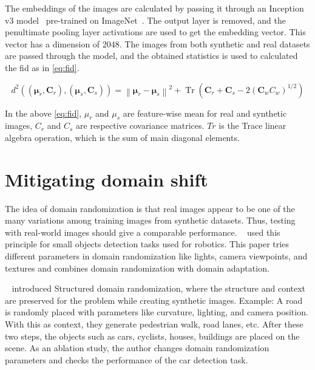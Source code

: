 The embeddings of the images are calculated by passing it through an Inception v3 model~\cite{Szegedy2016RethinkingTI} pre-trained on ImageNet~\cite{Deng2009ImageNetAL}.
The output layer is removed, and the penultimate pooling layer activations are used to get the embedding vector.
This vector has a dimension of 2048.
The images from both synthetic and real datasets are passed through the model, and the obtained statistics is used to calculated the \gls{fid} as in \autoref{eq:fid}.

\begin{equation}
    d^{2}\left((\boldsymbol{\mu}_{r}, \boldsymbol{C}_{r}),\left(\boldsymbol{\mu}_{s}, \boldsymbol{C}_{s}\right)\right)=\left\|\boldsymbol{\mu}_{r}-\boldsymbol{\mu}_{s}\right\|^{2}+\operatorname{Tr}\left(\boldsymbol{C}_{r}+\boldsymbol{C}_{s}-2\left(\boldsymbol{C}_{w} {C}_{w}\right)^{1 / 2}\right)
    \label{eq:fid}
\end{equation}

In the above \autoref{eq:fid}, $\mu_r$ and $\mu_s$ are feature-wise mean for real and synthetic images, $C_r$ and $C_s$ are respective covariance matrices.
$Tr$ is the Trace linear algebra operation, which is the sum of main diagonal elements.


\section{Mitigating domain shift}\label{sec:mitigating_domain_shift}

The idea of domain randomization is that real images appear to be one of the many variations among training images from synthetic datasets.
Thus, testing with real-world images should give a comparable performance.
~\cite{tobin2017domain} used this principle for small objects detection tasks used for robotics.
This paper tries different parameters in domain randomization like lights, camera viewpoints, and textures and combines domain randomization with domain adaptation.

~\cite{prakash2020structured} introduced Structured domain randomization, where the structure and context are preserved for the problem while creating synthetic images.
Example: A road is randomly placed with parameters like curvature, lighting, and camera position.
With this as context, they generate pedestrian walk, road lanes, etc.
After these two steps, the objects such as cars, cyclists, houses, buildings are placed on the scene.
As an ablation study, the author changes domain randomization parameters and checks the performance of the car detection task.

